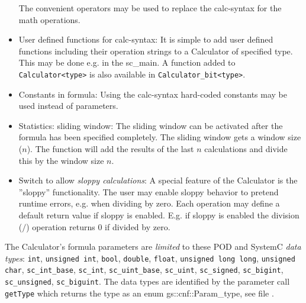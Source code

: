 \begin{itemize}
	The convenient operators may be used to replace the calc-syntax for the math operations. 
  \item User defined functions for calc-syntax: \vspace{.5em} \newline
  	It is simple to add user defined functions including their operation strings to a Calculator of 
	specified type. This may be done e.g. in the {\sffamily sc\_main}. A function added to 
    \lstinline|Calculator<type>| is also available in \lstinline|Calculator_bit<type>|.
  \item Constants in formula:  \vspace{.5em} \newline
  	Using the calc-syntax hard-coded constants may be used instead of parameters.
  \item Statistics: sliding window: \vspace{.5em} \newline
  	The sliding window can be activated after the formula has been specified completely. The sliding window gets a window size ($n$). The function will add the results of the last $n$ calculations and divide this by the window size $n$.
  \item Switch to allow {\em sloppy calculations}:  \vspace{.5em} \newline
  	A special feature of the \GreenAV Calculator is the ''sloppy'' functionality.
	The user may enable sloppy behavior to pretend runtime errors, e.g. when dividing by zero. Each 
	operation may define a default return value if sloppy is enabled. E.g. if sloppy is enabled the division
	(\colorbox{hellgrau}{$/$}) operation returns $0$ if divided by zero.
\end{itemize}

The Calculator's formula parameters are {\em limited} to these POD and SystemC {\em data types}: \newline
   \lstinline[language=TeX]|int|,
   \lstinline[language=TeX]|unsigned int|,
   \lstinline[language=TeX]|bool|,
   \lstinline[language=TeX]|double|,
   \lstinline[language=TeX]|float|,
   \lstinline[language=TeX]|unsigned long long|,
   \lstinline[language=TeX]|unsigned char|,
   \lstinline|sc_int_base|,
   \lstinline|sc_int|,
   \lstinline|sc_uint_base|,
   \lstinline|sc_uint|,
   \lstinline|sc_signed|,
   \lstinline|sc_bigint|,
   \lstinline|sc_unsigned|,
   \lstinline|sc_biguint|.  \newline
The data types are identified by the parameter call \lstinline|getType| which returns the type as an enum {\sffamily gs::cnf::Param\_type}, see file .

